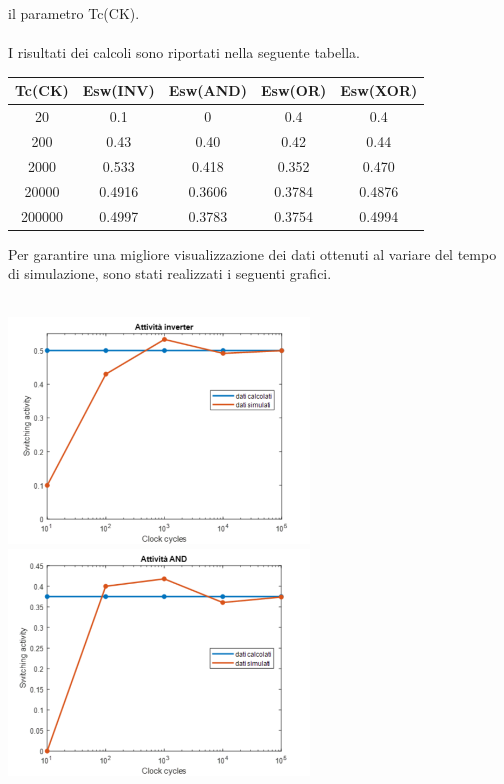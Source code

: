 \documentclass[11pt,  english, makeidx, a4paper, titlepage, oneside]{book}
\begin{document}
il parametro Tc(CK).
\\\\
I risultati dei calcoli sono riportati nella seguente tabella. 
\\
\begin{center}
	\begin{tabular}{|c|c|c|c|c|}
	\hline
	Tc(CK) & Esw(INV) & Esw(AND) & Esw(OR) & Esw(XOR) \\ 
	\hline
	20 & 0.1 & 0 & 0.4 & 0.4 \\
	\hline
	200 & 0.43 & 0.40 & 0.42 & 0.44 \\
	\hline
	2000 & 0.533 & 0.418 & 0.352 & 0.470 \\
	\hline
	20000 & 0.4916 & 0.3606 & 0.3784 & 0.4876 \\
	\hline
	200000 & 0.4997 & 0.3783 & 0.3754 & 0.4994 \\
	\hline
	\end{tabular}
\end{center}
\vspace{1cm}
Per garantire una migliore visualizzazione dei dati ottenuti 
al variare del tempo di simulazione, sono stati realizzati 
i seguenti grafici.
\\\\
\centerline{\includegraphics[width=8cm]{./img/Lab_1/Es_1/Inverter.png}
            \includegraphics[width=8cm]{./img/Lab_1/Es_1/AND.png}}
\newpage
\end{document}
